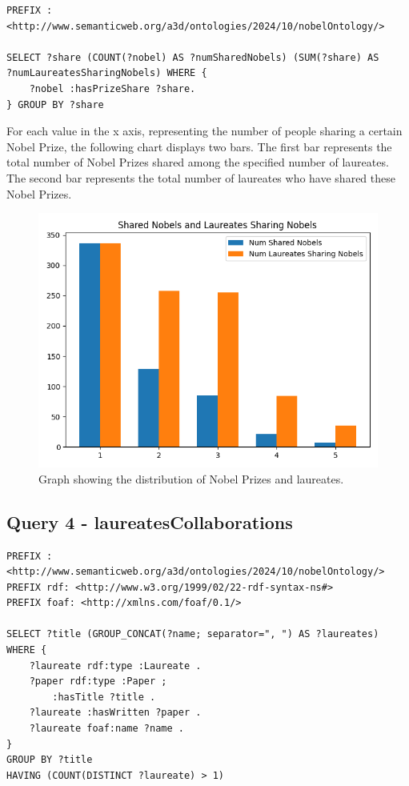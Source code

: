 \documentclass{article}
\begin{document}
\begin{lstlisting}
PREFIX : <http://www.semanticweb.org/a3d/ontologies/2024/10/nobelOntology/>

SELECT ?share (COUNT(?nobel) AS ?numSharedNobels) (SUM(?share) AS                    ?numLaureatesSharingNobels) WHERE {
    ?nobel :hasPrizeShare ?share.
} GROUP BY ?share
\end{lstlisting}

\noindent For each value in the x axis, representing the number of people sharing a certain Nobel Prize, the following chart displays two bars. 
The first bar represents the total number of Nobel Prizes shared among the specified number of laureates.
The second bar represents the total number of laureates who have shared these Nobel Prizes.
\begin{figure}[H]
    \centering
    \includegraphics[width=0.7\linewidth]{../queries/plots/prizeShare.png}
    \caption{Graph showing the distribution of Nobel Prizes and laureates.}
    \label{fig:prizeShare}
\end{figure}

\subsection*{Query 4 - laureatesCollaborations}

\begin{lstlisting}
PREFIX : <http://www.semanticweb.org/a3d/ontologies/2024/10/nobelOntology/>
PREFIX rdf: <http://www.w3.org/1999/02/22-rdf-syntax-ns#>
PREFIX foaf: <http://xmlns.com/foaf/0.1/>

SELECT ?title (GROUP_CONCAT(?name; separator=", ") AS ?laureates) WHERE {
    ?laureate rdf:type :Laureate .
    ?paper rdf:type :Paper ;
        :hasTitle ?title . 
    ?laureate :hasWritten ?paper .
    ?laureate foaf:name ?name .
}
GROUP BY ?title
HAVING (COUNT(DISTINCT ?laureate) > 1)    
\end{lstlisting}
\end{document}
